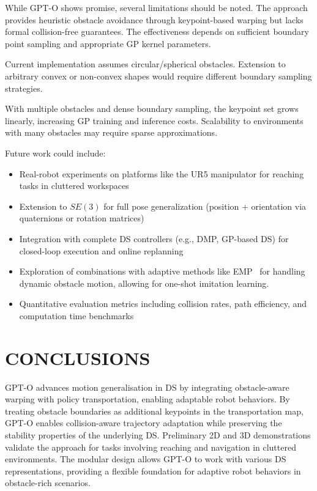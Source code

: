 \documentclass[a4paper, 10pt, conference]{ieeeconf}
\begin{document}
While GPT-O shows promise, several limitations should be noted.
The approach provides heuristic obstacle avoidance through keypoint-based warping but lacks formal collision-free guarantees.
The effectiveness depends on sufficient boundary point sampling and appropriate GP kernel parameters.

Current implementation assumes circular/spherical obstacles. Extension to arbitrary convex or non-convex shapes would require different boundary sampling strategies.

With multiple obstacles and dense boundary sampling, the keypoint set grows linearly, increasing GP training and inference costs.
Scalability to environments with many obstacles may require sparse approximations.

Future work could include:
\begin{itemize}
    \item Real-robot experiments on platforms like the UR5 manipulator for reaching tasks in cluttered workspaces
    \item Extension to $SE(3)$ for full pose generalization (position + orientation via quaternions or rotation matrices)
    \item Integration with complete DS controllers (e.g., DMP, GP-based DS) for closed-loop execution and online replanning
    \item Exploration of combinations with adaptive methods like EMP~\cite{li2025elastic} for handling dynamic obstacle motion, allowing for one-shot imitation learning.
    \item Quantitative evaluation metrics including collision rates, path efficiency, and computation time benchmarks
\end{itemize}

\section{CONCLUSIONS}

GPT-O advances motion generalisation in DS by integrating obstacle-aware warping with policy transportation, enabling adaptable robot behaviors.
By treating obstacle boundaries as additional keypoints in the transportation map, GPT-O enables collision-aware trajectory adaptation while preserving the stability properties of the underlying DS.\@
Preliminary 2D and 3D demonstrations validate the approach for tasks involving reaching and navigation in cluttered environments.
The modular design allows GPT-O to work with various DS representations, providing a flexible foundation for adaptive robot behaviors in obstacle-rich scenarios.
\end{document}
